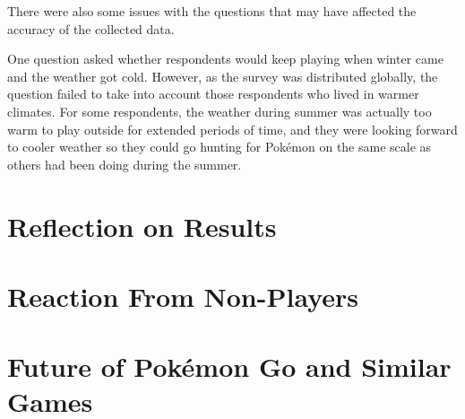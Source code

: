 There were also some issues with the questions that may have affected the accuracy of the collected data.

One question asked whether respondents would keep playing when winter came and the weather got cold. However, as the survey was distributed globally, the question failed to take into account those respondents who lived in warmer climates. For some respondents, the weather during summer was actually too warm to play outside for extended periods of time, and they were looking forward to cooler weather so they could go hunting for Pokémon on the same scale as others had been doing during the summer.

\section{Reflection on Results}


\section{Reaction From Non-Players}


\section{Future of Pokémon Go and Similar Games}

